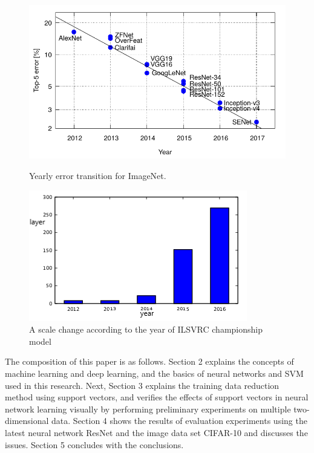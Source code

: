 \begin{figure}[t]
  \begin{minipage}{0.49\hsize}
\begin{center}
\includegraphics[width=\linewidth]{fig/y_o2.pdf}
\end{center}
\caption{Yearly error transition for ImageNet.}
\vspace*{-3pt}
\end{minipage}
\begin{minipage}{0.49\hsize}
\begin{center}
\includegraphics[width=\linewidth]{fig/fig2.png}
\end{center}
\caption{A scale change according to the year of ILSVRC championship model}
\vspace*{-3pt}
        \end{minipage}
\end{figure}


The composition of this paper is as follows. Section 2 explains the concepts of machine learning and deep learning, and the basics of neural networks and SVM used in this research.
Next, Section 3 explains the training data reduction method using support vectors, and verifies the effects of support vectors in neural network learning visually by performing preliminary experiments on multiple two-dimensional data. Section 4 shows the results of evaluation experiments using the latest neural network ResNet and the image data set CIFAR-10 and discusses the issues. Section 5 concludes with the conclusions.
